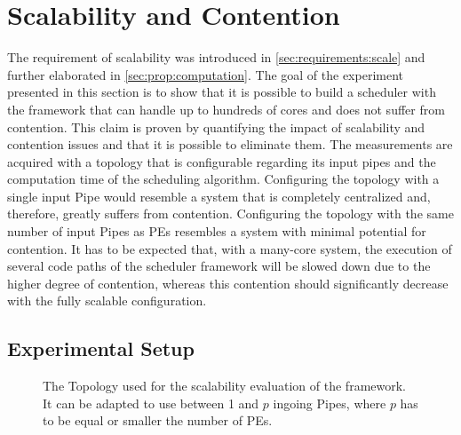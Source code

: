 \section{Scalability and Contention}%
\label{sec:studies:scale}

The requirement of scalability was introduced in \cref{sec:requirements:scale} and further elaborated in \cref{sec:prop:computation}. The goal of the experiment presented in this section is to show that it is possible to build a scheduler with the \cobas{} framework that can handle up to hundreds of cores and does not suffer from contention. This claim is proven by quantifying the impact of scalability and contention issues and that it is possible to eliminate them. The measurements are acquired with a topology that is configurable regarding its input pipes and the computation time of the scheduling algorithm. Configuring the topology with a single input Pipe would resemble a system that is completely centralized and, therefore, greatly suffers from contention. Configuring the topology with the same number of input Pipes as \acp{PE} resembles a system with minimal potential for contention. It has to be expected that, with a many-core system, the execution of several code paths of the scheduler framework will be slowed down due to the higher degree of contention, whereas this contention should significantly decrease with the fully scalable configuration.

\subsection{Experimental Setup}

\begin{figure}[!b] \centering
	\caption[The Topology used for the scalability evaluation.]{The Topology used for the scalability evaluation of the \cobas{} framework. It can be adapted to use between 1 and \(p\) ingoing Pipes, where \(p\) has to be equal or smaller the number of \acp{PE}.}%
	\label{fig:eval:scale-topo}
\end{figure}


